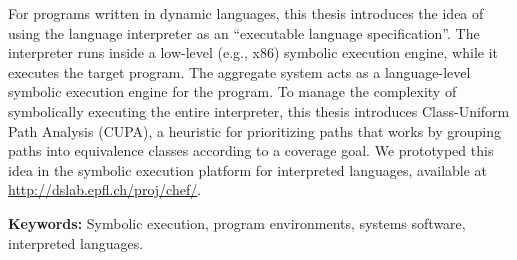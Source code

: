 For programs written in dynamic languages, this thesis introduces the idea of using the language interpreter as an ``executable language specification''.  The interpreter runs inside a low-level (e.g., x86) symbolic execution engine, while it executes the target program.  The aggregate system acts as a language-level symbolic execution engine for the program.
%
To manage the complexity of symbolically executing the entire interpreter, this thesis introduces Class-Uniform Path Analysis (CUPA), a heuristic for prioritizing paths that works by grouping paths into equivalence classes according to a coverage goal.
%
We prototyped this idea in the \emph{\chef} symbolic execution platform for interpreted languages, available at {\url{http://dslab.epfl.ch/proj/chef/}}.

\noindent \textbf{Keywords:} Symbolic execution, program environments, systems software, interpreted languages.


